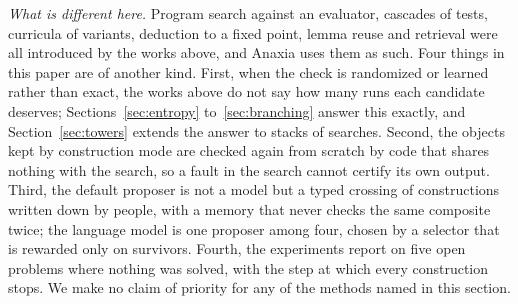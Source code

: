 \emph{What is different here.} Program search against an evaluator, cascades of tests, curricula of variants, deduction to a fixed point, lemma reuse and retrieval were all introduced by the works above, and Anaxia uses them as such. Four things in this paper are of another kind. First, when the check is randomized or learned rather than exact, the works above do not say how many runs each candidate deserves; Sections~\ref{sec:entropy} to~\ref{sec:branching} answer this exactly, and Section~\ref{sec:towers} extends the answer to stacks of searches. Second, the objects kept by construction mode are checked again from scratch by code that shares nothing with the search, so a fault in the search cannot certify its own output. Third, the default proposer is not a model but a typed crossing of constructions written down by people, with a memory that never checks the same composite twice; the language model is one proposer among four, chosen by a selector that is rewarded only on survivors. Fourth, the experiments report on five open problems where nothing was solved, with the step at which every construction stops. We make no claim of priority for any of the methods named in this section.
